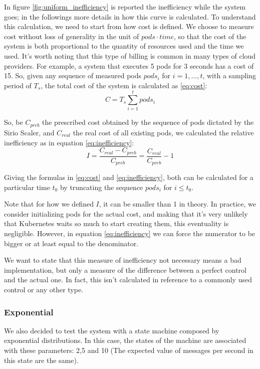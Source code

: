 In figure \ref{fig:uniform_inefficiency} is reported the inefficiency while the system goes; in the followings more details in how this curve is calculated. To understand this calculation, we need to start from how cost is defined. We choose to measure cost without loss of generality in the unit of $pods \cdot time$, so that the cost of the system is both proportional to the quantity of resources used and the time we used. It's worth noting that this type of billing is common in many types of cloud providers. For example, a system that executes 5 pods for 3 seconds has a cost of 15. So, given any sequence of measured pods $pods_i$ for $i=1,\dots,t$, with a sampling period of $T_s$, the total cost of the system is calculated as \ref{eq:cost}:
\begin{equation}
    \label{eq:cost}
    C = T_s\sum_{i=1}^{t}pods_i
\end{equation}

So, be $C_{preb}$ the prescribed cost obtained by the sequence of pods dictated by the Sirio Scaler, and $C_{real}$ the real cost of all existing pods, we calculated the relative inefficiency as in equation \ref{eq:inefficiency}:
\begin{equation}
    \label{eq:inefficiency}
    I =\frac{C_{real} - C_{preb}}{C_{preb}} = \frac{C_{real}}{C_{preb}} - 1
\end{equation}

Giving the formulas in \ref{eq:cost} and \ref{eq:inefficiency}, both can be calculated for a particular time $t_0$ by truncating the sequence $pods_i$ for $i\leq t_0$.

Note that for how we defined $I$, it can be smaller than 1 in theory. In practice, we consider initializing pods for the actual cost, and making that it's very unlikely that Kubernetes waits so much to start creating them, this eventuality is negligible. However, in equation \ref{eq:inefficiency} we can force the numerator to be bigger or at least equal to the denominator.

We want to state that this measure of inefficiency not necessary means a bad implementation, but only a measure of the difference between a perfect control and the actual one. In fact, this isn't calculated in reference to a commonly used control or any other type.

\subsubsection{Exponential}
We also decided to test the system with a state machine composed by exponential distributions. In this case, the states of the machine are associated with these parameters: 2,5 and 10 (The expected value of messages per second in this state are the same). 

